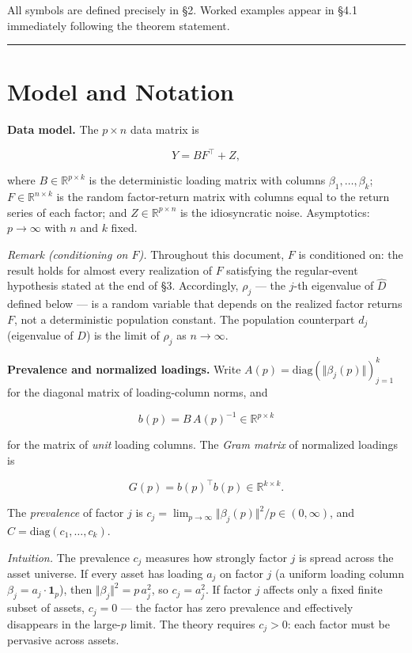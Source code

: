 \documentclass{article}
\theoremstyle{remark}
\begin{document}
All symbols are defined precisely in §2. Worked examples appear in §4.1 immediately following the theorem statement.

\medskip\noindent\rule{\linewidth}{0.4pt}\medskip

\section{Model and Notation}

\textbf{Data model.} The $p\times n$ data matrix is

\[
Y = BF^\top + Z,
\]

where $B \in \mathbb{R}^{p\times k}$ is the deterministic loading matrix with columns $\beta_1,\ldots,\beta_k$; $F \in \mathbb{R}^{n\times k}$ is the random factor-return matrix with columns equal to the return series of each factor; and $Z\in\mathbb{R}^{p\times n}$ is the idiosyncratic noise. Asymptotics: $p\to\infty$ with $n$ and $k$ fixed.

\textit{Remark (conditioning on $F$).} Throughout this document, $F$ is conditioned on: the result holds for almost every realization of $F$ satisfying the regular-event hypothesis stated at the end of §3. Accordingly, $\rho_j$ — the $j$-th eigenvalue of $\hat{D}$ defined below — is a random variable that depends on the realized factor returns $F$, not a deterministic population constant. The population counterpart $d_j$ (eigenvalue of $D$) is the limit of $\rho_j$ as $n\to\infty$.

\textbf{Prevalence and normalized loadings.} Write $A(p) = \mathrm{diag}(\Vert \beta_j(p)\Vert )_{j=1}^k$ for the diagonal matrix of loading-column norms, and

\[
b(p) = B\,A(p)^{-1} \in \mathbb{R}^{p\times k}
\]

for the matrix of \textit{unit} loading columns. The \textit{Gram matrix} of normalized loadings is

\[
G(p) = b(p)^\top b(p) \in \mathbb{R}^{k\times k}.
\]

The \textit{prevalence} of factor $j$ is $c_j = \lim_{p\to\infty}\Vert \beta_j(p)\Vert^2/p \in (0,\infty)$, and $C = \mathrm{diag}(c_1,\ldots,c_k)$.

\textit{Intuition.} The prevalence $c_j$ measures how strongly factor $j$ is spread across the asset universe. If every asset has loading $a_j$ on factor $j$ (a uniform loading column $\beta_j = a_j\cdot\mathbf{1}_p$), then $\Vert \beta_j\Vert^2 = p\,a_j^2$, so $c_j = a_j^2$. If factor $j$ affects only a fixed finite subset of assets, $c_j = 0$ — the factor has zero prevalence and effectively disappears in the large-$p$ limit. The theory requires $c_j > 0$: each factor must be pervasive across assets.
\end{document}
